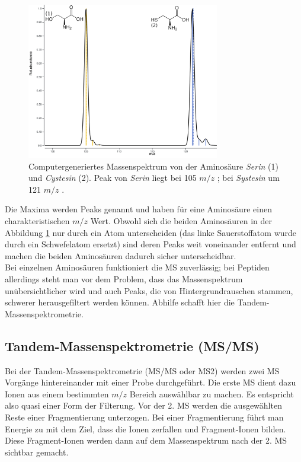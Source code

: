 \documentclass[a4paper, 12pt]{article}
\newcommand{\gerquot}[1]{\glqq#1\grqq}
\newcommand{\massCharge}{$ m/z $ }
\begin{document}
\begin{figure}[ht]
   \includegraphics[width=0.75\textwidth]{./Resources/Simulated_Mass_Spectrum.png}
   \centering
   \caption{Computergeneriertes Massenspektrum von der Aminosäure \emph{Serin} (1) und \emph{Cystesin} (2). Peak von \emph{Serin} liegt bei 105 \massCharge; bei \emph{Systesin} um 121 \massCharge.}
   \label{fig:Sim_Mass_Spec}
\end{figure}

Die Maxima werden \gerquot{Peaks} genannt und haben für eine Aminosäure einen charakteristischen \massCharge Wert. Obwohl sich die beiden Aminosäuren in der Abbildung \ref{fig:Sim_Mass_Spec} nur durch ein Atom unterscheiden (das linke Sauerstoffatom wurde durch ein Schwefelatom ersetzt) sind deren Peaks weit voneinander entfernt und machen die beiden Aminosäuren dadurch sicher unterscheidbar.\\

Bei einzelnen Aminosäuren funktioniert die MS zuverlässig; bei Peptiden allerdings steht man vor dem Problem, dass das Massenspektrum unübersichtlicher wird und auch Peaks, die von Hintergrundrauschen stammen, schwerer herausgefiltert werden können. Abhilfe schafft hier die Tandem-Massenspektrometrie.

\subsection{Tandem-Massenspektrometrie (MS/MS)}\label{ss:Tandem_MS}
Bei der Tandem-Massenspektrometrie (MS/MS oder MS2) werden zwei MS Vorgänge hintereinander mit einer Probe durchgeführt. Die erste MS dient dazu Ionen aus einem bestimmten \massCharge Bereich auswählbar zu machen. Es entspricht also quasi einer Form der Filterung. Vor der 2. MS werden die ausgewählten Reste einer Fragmentierung unterzogen. Bei einer Fragmentierung führt man Energie zu mit dem Ziel, dass die Ionen zerfallen und Fragment-Ionen bilden. Diese Fragment-Ionen werden dann auf dem Massenspektrum nach der 2. MS sichtbar gemacht.
\end{document}
